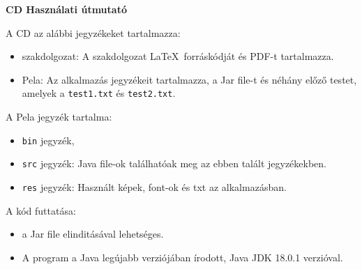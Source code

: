 \pagestyle{empty}

\noindent \textbf{\Large CD Használati útmutató}

\vskip 1cm

\noindent A CD az alábbi jegyzékeket tartalmazza:

\begin{itemize}
    \item szakdolgozat: A szakdolgozat \LaTeX\ forráskódját és PDF-t tartalmazza.
    \item Pela: Az alkalmazás jegyzékeit tartalmazza, a Jar file-t és néhány előző testet, amelyek a \texttt{test1.txt} és \texttt{test2.txt}.
\end{itemize}

\noindent A Pela jegyzék tartalma:

\begin{itemize}
    \item \texttt{bin} jegyzék,
    \item \texttt{src} jegyzék: Java file-ok találhatóak meg az ebben talált jegyzékekben.
    \item \texttt{res} jegyzék: Használt képek, font-ok és txt az alkalmazásban.
\end{itemize}

\noindent A kód futtatása:

\begin{itemize}
    \item a Jar file elinditásával lehetséges.
    \item A program a Java legújabb verziójában írodott, Java JDK 18.0.1 verzióval.
\end{itemize}

